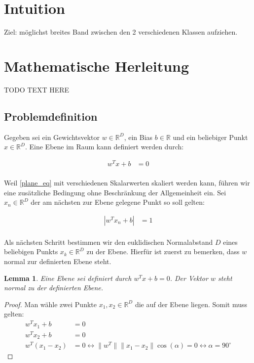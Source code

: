 \documentclass[a4paper,11pt,twoside]{scrreprt}
\newtheorem{lemma}[theorem]{Lemma}
\newcommand{\norm}[1]{\lVert#1\rVert}
\begin{document}
\section{Intuition}
Ziel: möglichst breites Band zwischen den 2 verschiedenen Klassen aufziehen.

\section{Mathematische Herleitung}

TODO TEXT HERE
\subsection{Problemdefinition}
Gegeben sei ein Gewichtsvektor $w \in \mathbb{R}^{D}$, ein Bias $b \in \mathbb{R}$ und ein beliebiger Punkt $x \in \mathbb{R}^{D}$. Eine Ebene im Raum kann definiert werden durch:

\begin{equation} \label{plane_eq}
    \begin{aligned}
    w^{T} x + b &= 0 \\
    \end{aligned}
\end{equation}

Weil \autoref{plane_eq} mit verschiedenen Skalarwerten skaliert werden kann, führen wir eine zusätzliche Bedingung ohne Beschränkung der Allgemeinheit ein. Sei $x_{n} \in \mathbb{R}^{D}$ der am nächsten zur Ebene gelegene Punkt so soll gelten:

\begin{equation} \label{plane_normalization}
	\begin{aligned}
		|w^{T} x_{n} + b| &= 1 \\
	\end{aligned}
\end{equation}

Als nächsten Schritt bestimmen wir den euklidischen Normalabstand $D$ eines beliebigen Punkts $x_{k} \in \mathbb{R}^{D}$ zu der Ebene. Hierfür ist zuerst zu bemerken, dass $w$ normal zur definierten Ebene steht.

\begin{lemma}
	Eine Ebene sei definiert durch $w^{T} x + b = 0$. Der Vektor $w$ steht normal zu der definierten Ebene.
\end{lemma}

\begin{proof}
	Man wähle zwei Punkte $x_{1}, x_{2} \in \mathbb{R}^{D}$ die auf der Ebene liegen. Somit muss gelten:
	\begin{equation}
		\begin{aligned}
			w^{T} x_{1} + b &= 0 \\
			w^{T} x_{2} + b &= 0 \\
			w^{T} (x_{1} - x_{2}) &= 0 \leftrightarrow \norm{w^{T}} \norm{x_{1} - x_{2}} \cos(\alpha) = 0 \leftrightarrow \alpha = 90^{\circ}
		\end{aligned}
	\end{equation}
\end{proof}
\end{document}
